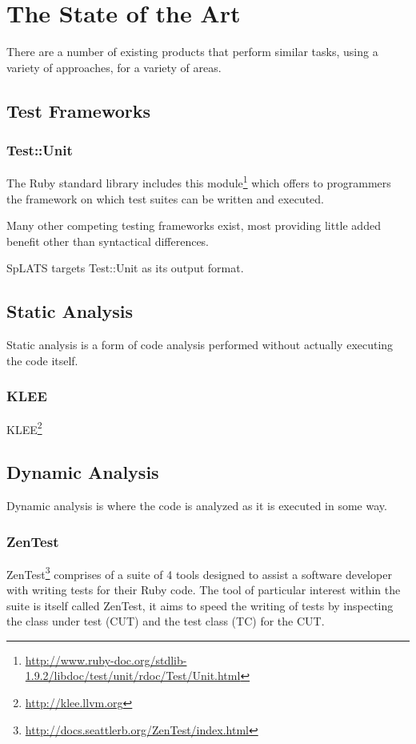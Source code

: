 \chapter{The State of the Art}

  There are a number of existing products that perform similar tasks, using a variety of approaches, for a variety of areas.

\section{Test Frameworks}

  \subsection{Test::Unit}
    The Ruby standard library includes this
module\footnote{\url{http://www.ruby-doc.org/stdlib-1.9.2/libdoc/test/unit/rdoc/Test/Unit.html}}
which offers to programmers the framework on which test suites can be written
and executed.

Many other competing testing frameworks exist, most providing little added
benefit other than syntactical differences.

SpLATS targets Test::Unit as its output format.

\section{Static Analysis}

  Static analysis is a form of code analysis performed without actually executing the code itself.

  \subsection{KLEE}
    KLEE\footnote{\url{http://klee.llvm.org}}

\section{Dynamic Analysis} 

  Dynamic analysis is where the code is analyzed as it is executed in some way.

  \subsection{ZenTest}
    ZenTest\footnote{\url{http://docs.seattlerb.org/ZenTest/index.html}}
comprises of a suite of 4 tools designed to assist a software developer with
writing tests for their Ruby code. The tool of particular interest within the suite is itself called ZenTest,
it aims to speed the writing of tests by inspecting the class under test (CUT)
and the test class (TC) for the CUT.

